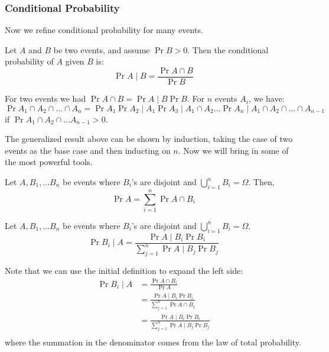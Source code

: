 \subsubsection{Conditional Probability}
Now we refine conditional probability for many events.

\begin{definition} 
    Let $A$ and $B$ be two events, and assume $\Pr{B} > 0$. Then the conditional probability of $A$ given $B$ is:
    \[ \Pr{A \mid B} = \frac{\Pr{A \cap B}}{\Pr{B}} \]
\end{definition}

\begin{theorem} 
    For two events we had $\Pr{A \cap B} = \Pr{A \mid B} \Pr{B}$. For $n$ events
    $A_i$, we have:
    \[ \Pr{A_1 \cap A_2 \cap \dots \cap A_n} = \Pr{A_1} \Pr{A_2 \mid A_1} \Pr{A_3 \mid A_1 \cap A_2} \dots \Pr{A_n \mid A_1 \cap A_2 \cap \dots \cap A_{n -1}} \]
    if $\Pr{A_1 \cap A_2 \cap \dots A_{n - 1}} > 0$.
\end{theorem}

The generalized result above can be shown by induction, taking the case of two events as the base case and then inducting on $n$.
Now we will bring in some of the most powerful tools.

\begin{theorem}
    Let $A, B_1, \dots B_n$ be events where $B_i$'s are disjoint and $\bigcup_{i=1}^n B_i = \Omega$.
    Then,
    \[ \Pr{A} = \sum_{i = 1}^n \Pr{A \cap B_i} \]
\end{theorem}

\begin{theorem} 
    Let $A, B_1, \dots B_n$ be events where $B_i$'s are disjoint and $\bigcup_{i=1}^n B_i = \Omega$.
    \[ \Pr{B_i \mid A} = \frac{\Pr{A \mid B_i} \Pr{B_i}}{\sum_{j = 1}^n \Pr{A \mid B_j}\Pr{B_j}} \]

    \begin{proof*}
        Note that we can use the initial definition to expand the left side:
        \begin{align*}
            \Pr{B_i \mid A} &= \frac{\Pr{A \cap B_i}}{\Pr{A}} \\
            &= \frac{\Pr{A \mid B_i} \Pr{B_i}}{\sum_{j = 1}^n \Pr{A \cap B_j}} \\
            &= \frac{\Pr{A \mid B_i} \Pr{B_i}}{\sum_{j = 1}^n \Pr{A \mid B_j} \Pr{B_j}} \\
        \end{align*}
        where the summation in the denominator comes from the law of total probability.
    \end{proof*}
\end{theorem}

